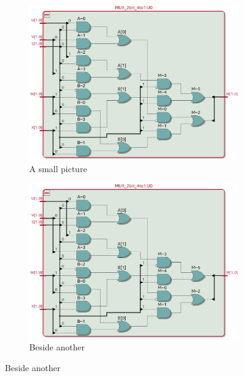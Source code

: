 \documentclass{article}
\begin{document}
\begin{figure}[h]
    \centering
    \begin{subfigure}{0.45\textwidth} %
        \centering
        \includegraphics[width=1\textwidth]{Figures/Example_RTL.png}
        \caption{A small picture}
        \label{fig:miniRTL1}
    \end{subfigure}
    \hfill %
    \begin{subfigure}{0.45\textwidth}
        \centering
        \includegraphics[width=1\textwidth]{Figures/Example_RTL.png}
        \caption{Beside another}
        \label{fig:miniRTL2}
    \end{subfigure}

\end{figure}
\end{document}
